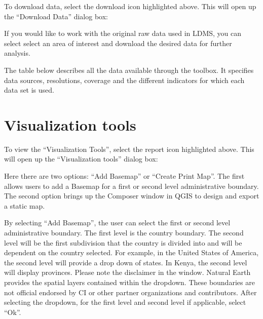 \documentclass[letterpaper,10pt,english]{sphinxmanual}
\begin{document}
\sphinxAtStartPar
To download data, select the download icon highlighted above. This will open up the
“Download Data” dialog box:

\sphinxAtStartPar
If you would like to work with the original raw data used in LDMS,
you can select select an area of interest and download the desired data for
further analysis.


\sphinxAtStartPar
The table below describes all the data available through the toolbox.
It specifies data sources, resolutions, coverage and the different indicators
for which each data set is used.

\sphinxstepscope


\chapter{Visualization tools}
\label{\detokenize{Qgis_Plugin/visualization:visualization-tools}}\label{\detokenize{Qgis_Plugin/visualization::doc}}



\sphinxAtStartPar
To view the “Visualization Tools”, select the report icon highlighted above. This will open up
the “Visualization tools” dialog box:


\sphinxAtStartPar
Here there are two options: “Add Basemap” or “Create Print Map”. The first allows users to add a Basemap for a first or second level administrative boundary. The second option brings up the Composer window in QGIS to design and export a static map.


\sphinxAtStartPar
By selecting “Add Basemap”, the user can select the first or second level administrative boundary. The first level is the country boundary. The second level will be the first sub\sphinxhyphen{}division that the country is divided into and will be dependent on the country selected. For example, in the United States of America, the second level will provide a drop down of states. In Kenya, the second level will display provinces.
Please note the disclaimer in the window. Natural Earth provides the spatial layers contained within the dropdown. These boundaries are not official endorsed by CI or other partner organizations and contributors.
After selecting the dropdown, for the first level and second level if applicable, select “Ok”.
\end{document}
